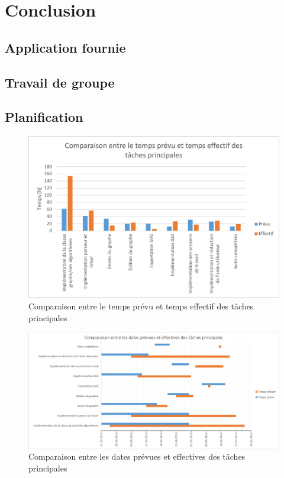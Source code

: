 \documentclass[french]{article}
\begin{document}
	\section{Conclusion}
	
		\subsection{Application fournie}
		
		\subsection{Travail de groupe}
		
		\subsection{Planification}
		
			\begin{figure}[H]
				\includegraphics[width=\textwidth]{Planification/comparaisonheures.pdf}
				\caption{Comparaison entre le temps prévu et temps effectif des tâches
					principales}
				\label{fig:comparaisonheures}
			\end{figure}
			
			\begin{figure}[H]
				\includegraphics[width=\textwidth]{Planification/comparaisondates.pdf}
				\caption{Comparaison entre les dates prévues et effectives des tâches principales}
				\label{fig:comparaisondates}
			\end{figure}
			
\end{document}
